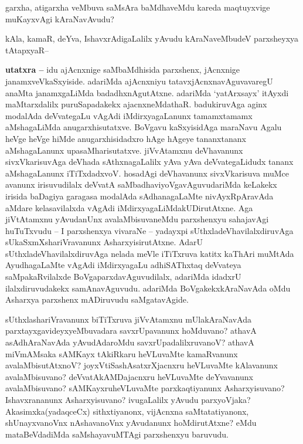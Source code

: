 
\begin{artha}
garxha, atigarxha veMbuva saMsAra baMdhaveMdu kareda maqtuyxvige muKayxvAgi kAraNavAvudu?

kAla, kamaR, deYva, IshavxrAdigaLalilx yAvudu kAraNaveMbudeV parxsheyxya tAtapxyaR--

\textbf{utatxra --} idu ajAcnxnige saMbaMdhisida parxshenx, jAcnxnige janamxveVkaSxyiside. ada\-riMda ajAcnxniyu tatavxjAcnxnavAguvavaregU  anaMta janamxgaLiMda badadhxnAgutAtxne. adariMda `yatArxsayx' itAyxdi maMtarxdalilx puruSapadakekx ajacnxneMdathaR. baduki\-ruvAga aginx modalAda deVvategaLu vAgAdi iMdirxyagaLanunx tamamxtamamx aMshagaLiMda anugarxhisutatxve. BoVgavu kaSxyisidAga maraNavu Agalu heVge heVge hiMde  anugarxhisidadxro hAge hAgeye tananxtananx aMshagaLanunx upasaMharisutatxve. jiVvAtamxnu deVhavanunx sivxVkarisuvAga deVhada sAthxnagaLalilx yAva yAva deVvategaLidudx tananx aMshagaLanunx iTiTxdadxvoV. hosadAgi deVhavanunx sivxVkarisuva muMce avanunx irisuvudilalx deVvatA saMbadhaviyoVgavAguvudariMda keLakekx irisida baDagiya garagasa modalAda sAdhanagaLaMte nivAyxRpAravAda aMdare kelasavilalxda vAgAdi iMdirxyagaLiMdakUDirutAtxne. Aga jiVtAtamxnu yAvudanUnx avalaMbisuvaneMdu parxshenxyu sahajavAgi huTuTxvudu -- I parxshenxya vivaraNe -- yadayxpi sUthxladeVhavilalxdiruvAga sUkaSxmXshariVravanunx AsharxyisirutAtxne. AdarU sUthxladeVhavilalxdiruvAga nelada meVle iTiTxruva katitx kaThAri muMtAda AyudhagaLaMte vAgAdi iMdirxyagaLu adhiSAThxtaq deVvateya saMpakaRvilalxde BoVgaparxdavAguvudilalx, adariMda idadxrU ilalxdiruvudakekx samAnavAguvudu. adariMda BoVgakekxkAraNavAda oMdu Asharxya parxshenx mADiruvudu saMgatavAgide.

sUthxlashariVravanunx biTiTxruva jiVvAtamxnu mUlakAraNavAda parxtayxgavideyx\break yeMbuvadara savxrUpavanunx hoMduvano? athavA asAdhAraNavAda yAvudA\-daroMdu savxrUpadalilxruvanoV? athavA miVmAMsaka sAMKayx tAkiRkaru heVLu\-vaMte kamaRvanunx avalaMbisutAtxnoV? joyxVtiSashAsatxrXjacnxru heVLuvaMte kAla\-vanunx avalaMbisuvano? deVvatAkAMDajacnxru heVLuvaMte deYvavanunx avalaMbisuvano? sAMKayxruheVLuvaMte parxkaqtiyanunx Asharxyisuvano? Ishavxrananunx Asharxyisuvano? ivugaLalilx yAvudu parxyoVjaka? Akasimxka(yadaqceCx) sithxtiyanonx, vijAcnxna saMta\-tatiyanonx, shUnayxvanoVnx nAshavanoVnx yAvudanunx hoMdirutAtxne? eMdu mata\-BeVdadiMda saMshayavuMTAgi parxshenxyu baruvudu.


\end{artha}
